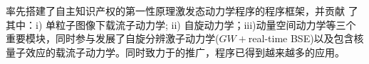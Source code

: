 \begin{center}
  \begin{InnovationBox}
    率先搭建了自主知识产权的第一性原理激发态动力学程序\hnamd{}的程序框架，并贡献
    了其中：i) 单粒子图像下载流子动力学; ii) 自旋动力学；iii)动量空间动力学等三个
    重要模块，同时参与发展了自旋分辨激子动力学($GW{}+{}$real-time BSE)以及包含核
    量子效应的载流子动力学。同时致力于\hnamd{}的推广，程序已得到越来越多的应用。
  \end{InnovationBox}
\end{center}




